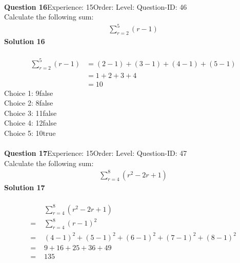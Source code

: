 \documentclass{article}
\begin{document}
\\[4pt]
\noindent\textbf{Question 16}\hspace{20pt}Experience: 15\hspace{20pt}Order: \hspace{20pt}Level: \hspace{20pt}Question-ID: 46\\[2pt]
Calculate the following sum:
\begin{align*}
\sum_{r=2}^{5} (r-1)
\end{align*}
\noindent\textbf{Solution 16}\\[2pt]
\\[-35pt]\begin{align*}
\sum_{r=2}^{5} (r-1)&=(2-1)+(3-1)+(4-1)+(5-1)\\[2pt]
&=1+2+3+4\\[2pt]
&=10
\end{align*}
Choice 1: \hspace{20pt}9\hspace{20pt}false\\
Choice 2: \hspace{20pt}8\hspace{20pt}false\\
Choice 3: \hspace{20pt}11\hspace{20pt}false\\
Choice 4: \hspace{20pt}12\hspace{20pt}false\\
Choice 5: \hspace{20pt}10\hspace{20pt}true\\
\\[4pt]
\noindent\textbf{Question 17}\hspace{20pt}Experience: 15\hspace{20pt}Order: \hspace{20pt}Level: \hspace{20pt}Question-ID: 47\\[2pt]
Calculate the following sum:
\begin{align*}
\sum_{r=4}^{8} (r^2-2r+1)
\end{align*}
\noindent\textbf{Solution 17}\\[2pt]
\\[-35pt]\begin{align*}
&\sum_{r=4}^{8} (r^2-2r+1)\\[2pt]
=\,\,&\sum_{r=4}^{8} (r-1)^2\\[2pt]
=\,\,&(4-1)^2+(5-1)^2+(6-1)^2+(7-1)^2+(8-1)^2\\[2pt]
=\,\,&9+16+25+36+49\\[2pt]
=\,\,&135
\end{align*}
\end{document}
